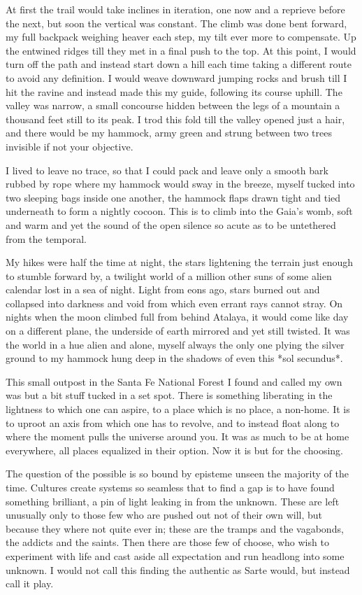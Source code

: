 \documentclass[ebook, 10pt, openright, onecolumn]{memoir}
\newcommand*\td[1]{
  \todo[inline]{
     #1 
  }
}
\newcommand*\finish{\td{ ----- Finish this section -----}}
\begin{document}
At first the trail would take inclines in iteration, one now and a reprieve
before the next, but soon the vertical was constant.  The climb was done bent
forward, my full backpack weighing heaver each step, my tilt ever more to
compensate.  Up the entwined ridges till they met in a final push to the top.
At this point, I would turn off the path and instead start down a hill each time
taking a different route to avoid any definition. I would weave downward jumping
rocks and brush till I hit the ravine and instead made this my guide, following
its course uphill.  The valley was narrow, a small concourse hidden between the
legs of a mountain a thousand feet still to its peak.  I trod this fold till the
valley opened just a hair, and there would be my hammock, army green and strung
between two trees invisible if not your objective.

I lived to leave no trace, so that I could pack and leave only a smooth bark
rubbed by rope where my hammock would sway in the breeze, myself tucked into two
sleeping bags inside one another, the hammock flaps drawn tight and tied
underneath to form a nightly cocoon.  This is to climb into the Gaia's womb,
soft and warm and yet the sound of the open silence so acute as to be untethered
from the temporal.

My hikes were half the time at night, the stars lightening the terrain just
enough to stumble forward by, a twilight world of a million other suns of some
alien calendar lost in a sea of night.  Light from eons ago, stars burned out
and collapsed into darkness and void from which even errant rays cannot stray.
On nights when the moon climbed full from behind Atalaya, it would come like day
on a different plane, the underside of earth mirrored and yet still twisted.  It
was the world in a hue alien and alone, myself always the only one plying the
silver ground to my hammock hung deep in the shadows of even this *sol
secundus*.

This small outpost in the Santa Fe National Forest I found and called my own was
but a bit stuff tucked in a set spot.  There is something liberating in the
lightness to which one can aspire, to a place which is no place, a non-home.  It
is to uproot an axis from which one has to revolve, and to instead float along
to where the moment pulls the universe around you.  It was as much to be at home
everywhere, all places equalized in their option. Now it is but for the
choosing.  

\finish

The question of the possible is so bound by episteme unseen the majority of the
time.  Cultures create systems so seamless that to find a gap is to have found
something brilliant, a pin of light leaking in from the unknown.  These are left
unusually only to those few who are pushed out not of their own will, but
because they where not quite ever in; these are the tramps and the vagabonds,
the addicts and the saints.  Then there are those few of choose, who wish to
experiment with life and cast aside all expectation and run headlong into some
unknown.  I would not call this finding the authentic as Sarte would, but
instead call it play.
\end{document}

